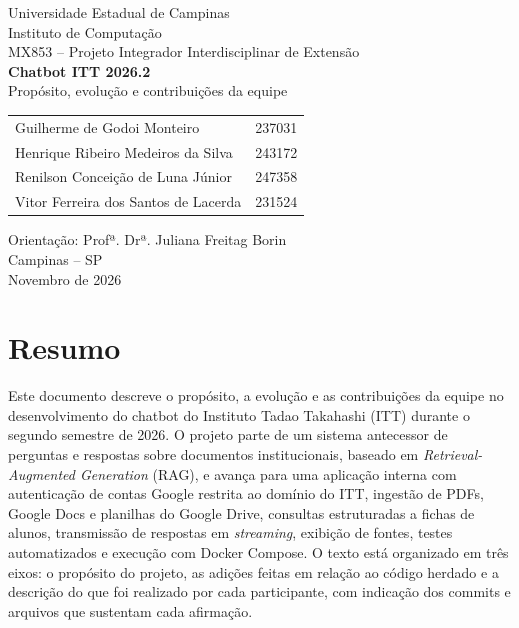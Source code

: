 \documentclass[12pt,a4paper]{article}
\begin{document}
\begin{titlepage}
  \thispagestyle{empty}
  \begin{center}
    {\Large Universidade Estadual de Campinas}\\[0.2cm]
    {\large Instituto de Computação}\\[2.0cm]

    {\large MX853 -- Projeto Integrador Interdisciplinar de Extensão}\\[2.5cm]

    {\Huge\bfseries Chatbot ITT 2026.2}\\[0.5cm]
    {\Large Propósito, evolução e contribuições da equipe}\\[2.5cm]

    \begin{tabular}{ll}
      Guilherme de Godoi Monteiro & 237031\\
      Henrique Ribeiro Medeiros da Silva & 243172\\
      Renilson Conceição de Luna Júnior & 247358\\
      Vitor Ferreira dos Santos de Lacerda & 231524\\
    \end{tabular}

    \vfill
    {\large Orientação: Profª. Drª. Juliana Freitag Borin}\\[0.5cm]
    {\large Campinas -- SP}\\[0.2cm]
    {\large Novembro de 2026}
  \end{center}
\end{titlepage}

\section*{Resumo}

Este documento descreve o propósito, a evolução e as contribuições da equipe no
desenvolvimento do chatbot do Instituto Tadao Takahashi (ITT) durante o segundo
semestre de 2026. O projeto parte de um sistema antecessor de perguntas e respostas
sobre documentos institucionais, baseado em \emph{Retrieval-Augmented Generation}
(RAG), e avança para uma aplicação interna com autenticação de contas Google
restrita ao domínio do ITT, ingestão de PDFs, Google Docs e planilhas do Google
Drive, consultas estruturadas a fichas de alunos, transmissão de respostas em
\emph{streaming}, exibição de fontes, testes automatizados e execução com Docker
Compose. O texto está organizado em três eixos: o propósito do projeto, as adições
feitas em relação ao código herdado e a descrição do que foi realizado por cada
participante, com indicação dos commits e arquivos que sustentam cada afirmação.
\end{document}
